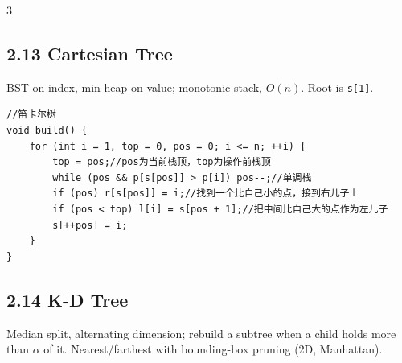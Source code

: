 \documentclass[8pt]{extarticle}
\begin{document}
\begin{multicols*}{3}
\subsection*{2.13 Cartesian Tree}

BST on index, min-heap on value; monotonic stack, $O(n)$. Root is \texttt{s[1]}.


\begin{lstlisting}
//笛卡尔树
void build() {
    for (int i = 1, top = 0, pos = 0; i <= n; ++i) {
        top = pos;//pos为当前栈顶，top为操作前栈顶
        while (pos && p[s[pos]] > p[i]) pos--;//单调栈
        if (pos) r[s[pos]] = i;//找到一个比自己小的点，接到右儿子上
        if (pos < top) l[i] = s[pos + 1];//把中间比自己大的点作为左儿子
        s[++pos] = i;
    }
}
\end{lstlisting}

\subsection*{2.14 K-D Tree}

Median split, alternating dimension; rebuild a subtree when a child holds more than $\alpha$ of it. Nearest/farthest with bounding-box pruning (2D, Manhattan).



\end{multicols*}
\end{document}
